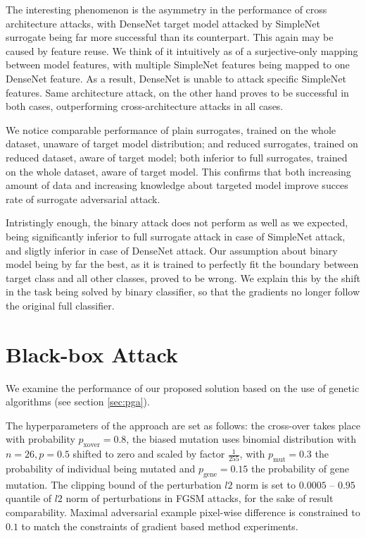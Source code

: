 The interesting phenomenon is the asymmetry in the performance of cross architecture attacks, with DenseNet target model attacked by SimpleNet surrogate being far more successful than its counterpart. This again may be caused by feature reuse. We think of it intuitively as of a surjective-only mapping between model features, with multiple SimpleNet features being mapped to one DenseNet feature. As a result, DenseNet is unable to attack specific SimpleNet features. Same architecture attack, on the other hand proves to be successful in both cases, outperforming cross-architecture attacks in all cases.

We notice comparable performance of plain surrogates, trained on the whole dataset, unaware of target model distribution; and reduced surrogates, trained on reduced dataset, aware of target model; both inferior to full surrogates, trained on the whole dataset, aware of target model. This confirms that both increasing amount of data and increasing knowledge about targeted model improve succes rate of surrogate adversarial attack.

Intristingly enough, the binary attack does not perform as well as we expected, being significantly inferior to full surrogate attack in case of SimpleNet attack, and sligtly inferior in case of DenseNet attack. Our assumption about binary model being by far the best, as it is trained to perfectly fit the boundary between target class and all other classes, proved to be wrong. We explain this by the shift in the task being solved by binary classifier, so that the gradients no longer follow the original full classifier.

\section{Black-box Attack}
\label{sec:blackbox_ga}
We examine the performance of our proposed solution based on the use of genetic algorithms (see section \ref{sec:pga}).

The hyperparameters of the approach are set as follows: the cross-over takes place with probability $p_\text{xover} = 0.8$, the biased mutation uses binomial distribution with $n = 26, p = 0.5$ shifted to zero and scaled by factor $\frac{1}{255}$, with $p_\text{mut} = 0.3$ the probability of individual being mutated and $p_\text{gene} = 0.15$ the probability of gene mutation. The clipping bound of the perturbation $l2$ norm is set to $0.0005$ -- $0.95$ quantile of $l2$ norm of perturbations in FGSM attacks, for the sake of result comparability. Maximal adversarial example pixel-wise difference is constrained to $0.1$ to match the constraints of gradient based method experiments.

